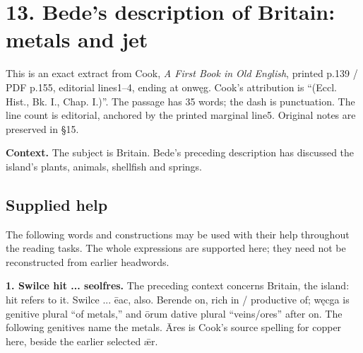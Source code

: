 \section*{13. Bede’s description of Britain: metals and jet}

This is an exact extract from Cook, \emph{A First Book in Old English}, printed p.139 /\allowbreak{} PDF p.155, editorial lines1–4, ending at onwęg. Cook’s attribution is “(Eccl. Hist., Bk. I., Chap. I.)”. The passage has 35 words; the dash is punctuation. The line count is editorial, anchored by the printed marginal line5. Original notes are preserved in §15.

\textbf{Context.} The subject is Britain. Bede’s preceding description has discussed the island’s plants, animals, shellfish and springs.

\par\begin{minipage}{\linewidth}\raggedright

\end{minipage}\par
{}
\subsection*{Supplied help}

The following words and constructions may be used with their help throughout the reading tasks. The whole expressions are supported here; they need not be reconstructed from earlier headwords.

\textbf{1. Swilce hit ... seolfres.} The preceding context concerns Britain, the island: hit refers to it. Swilce ... ēac, also. Berende on, rich in /\allowbreak{} productive of; węcga is genitive plural “of metals,” and ōrum dative plural “veins/\allowbreak{}ores” after on. The following genitives name the metals. Āres is Cook’s source spelling for copper here, beside the earlier selected ǣr.

